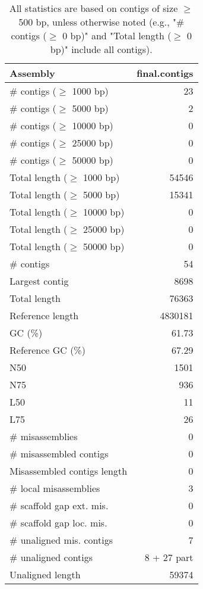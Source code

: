 \documentclass[12pt,a4paper]{article}
\begin{document}
\begin{table}[ht]
\begin{center}
\caption{All statistics are based on contigs of size $\geq$ 500 bp, unless otherwise noted (e.g., "\# contigs ($\geq$ 0 bp)" and "Total length ($\geq$ 0 bp)" include all contigs).}
\begin{tabular}{|l*{1}{|r}|}
\hline
Assembly & final.contigs \\ \hline
\# contigs ($\geq$ 1000 bp) & 23 \\ \hline
\# contigs ($\geq$ 5000 bp) & 2 \\ \hline
\# contigs ($\geq$ 10000 bp) & 0 \\ \hline
\# contigs ($\geq$ 25000 bp) & 0 \\ \hline
\# contigs ($\geq$ 50000 bp) & 0 \\ \hline
Total length ($\geq$ 1000 bp) & 54546 \\ \hline
Total length ($\geq$ 5000 bp) & 15341 \\ \hline
Total length ($\geq$ 10000 bp) & 0 \\ \hline
Total length ($\geq$ 25000 bp) & 0 \\ \hline
Total length ($\geq$ 50000 bp) & 0 \\ \hline
\# contigs & 54 \\ \hline
Largest contig & 8698 \\ \hline
Total length & 76363 \\ \hline
Reference length & 4830181 \\ \hline
GC (\%) & 61.73 \\ \hline
Reference GC (\%) & 67.29 \\ \hline
N50 & 1501 \\ \hline
N75 & 936 \\ \hline
L50 & 11 \\ \hline
L75 & 26 \\ \hline
\# misassemblies & 0 \\ \hline
\# misassembled contigs & 0 \\ \hline
Misassembled contigs length & 0 \\ \hline
\# local misassemblies & 3 \\ \hline
\# scaffold gap ext. mis. & 0 \\ \hline
\# scaffold gap loc. mis. & 0 \\ \hline
\# unaligned mis. contigs & 7 \\ \hline
\# unaligned contigs & 8 + 27 part \\ \hline
Unaligned length & 59374 \\ \hline

\end{tabular}
\end{center}
\end{table}
\end{document}

